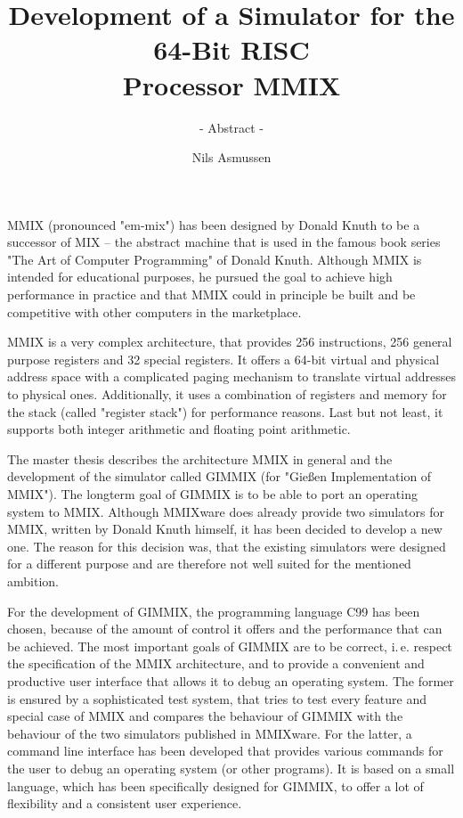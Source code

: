 \documentclass[a4paper,11pt]{article}
\newcommand{\ie}{i.\,e. }
\begin{document}
\title{Development of a Simulator for the 64-Bit RISC\\ Processor MMIX}
\author{- Abstract -}
\date{Nils Asmussen}
\maketitle

MMIX (pronounced "em-mix") has been designed by Donald Knuth to be a successor of MIX -- the abstract machine that is used in the famous book series "The Art of Computer Programming" of Donald Knuth. Although MMIX is intended for educational purposes, he pursued the goal to achieve high performance in practice and that MMIX could in principle be built and be competitive with other computers in the marketplace.

\medskip

MMIX is a very complex architecture, that provides 256 instructions, 256 general purpose registers and 32 special registers. It offers a 64-bit virtual and physical address space with a complicated paging mechanism to translate virtual addresses to physical ones. Additionally, it uses a combination of registers and memory for the stack (called "register stack") for performance reasons. Last but not least, it supports both integer arithmetic and floating point arithmetic.

\medskip

The master thesis describes the architecture MMIX in general and the development of the simulator called GIMMIX (for "Gießen Implementation of MMIX"). The longterm goal of GIMMIX is to be able to port an operating system to MMIX. Although MMIXware does already provide two simulators for MMIX, written by Donald Knuth himself, it has been decided to develop a new one. The reason for this decision was, that the existing simulators were designed for a different purpose and are therefore not well suited for the mentioned ambition.

\medskip

For the development of GIMMIX, the programming language C99 has been chosen, because of the amount of control it offers and the performance that can be achieved. The most important goals of GIMMIX are to be correct, \ie respect the specification of the MMIX architecture, and to provide a convenient and productive user interface that allows it to debug an operating system. The former is ensured by a sophisticated test system, that tries to test every feature and special case of MMIX and compares the behaviour of GIMMIX with the behaviour of the two simulators published in MMIXware. For the latter, a command line interface has been developed that provides various commands for the user to debug an operating system (or other programs). It is based on a small language, which has been specifically designed for GIMMIX, to offer a lot of flexibility and a consistent user experience.
\end{document}
